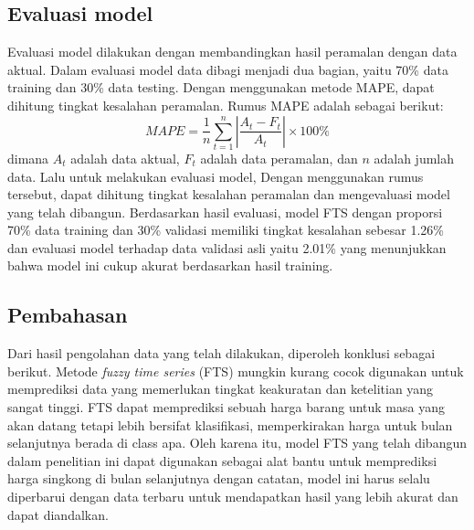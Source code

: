 \documentclass[conference]{IEEEtran}
\begin{document}
\subsection{Evaluasi model}
Evaluasi model dilakukan dengan membandingkan hasil peramalan dengan data aktual. Dalam evaluasi model data dibagi menjadi dua bagian, yaitu 70\% data training dan 30\% data testing. Dengan menggunakan metode MAPE, dapat dihitung tingkat kesalahan peramalan. Rumus MAPE adalah sebagai berikut:
\begin{equation}
    MAPE = \frac{1}{n} \sum_{t=1}^{n} \left| \frac{A_t - F_t}{A_t} \right| \times 100\%
\end{equation}
dimana $A_t$ adalah data aktual, $F_t$ adalah data peramalan, dan $n$ adalah jumlah data. Lalu untuk melakukan evaluasi model,  
Dengan menggunakan rumus tersebut, dapat dihitung tingkat kesalahan peramalan dan mengevaluasi model yang telah dibangun. Berdasarkan hasil evaluasi, model FTS dengan proporsi 70\% data training dan 30\% validasi memiliki tingkat kesalahan sebesar 1.26\% dan evaluasi model terhadap data validasi asli yaitu 2.01\% yang menunjukkan bahwa model ini cukup akurat berdasarkan hasil training.

\subsection{Pembahasan}
Dari hasil pengolahan data yang telah dilakukan, diperoleh konklusi sebagai berikut. Metode \textit{fuzzy time series} (FTS) mungkin kurang cocok digunakan untuk memprediksi data yang memerlukan tingkat keakuratan dan ketelitian yang sangat tinggi. FTS dapat memprediksi sebuah harga barang untuk masa yang akan datang tetapi lebih bersifat klasifikasi, memperkirakan harga untuk bulan selanjutnya berada di class apa. Oleh karena itu, model FTS yang telah dibangun dalam penelitian ini dapat digunakan sebagai alat bantu untuk memprediksi harga singkong di bulan selanjutnya dengan catatan, model ini harus selalu diperbarui dengan data terbaru untuk mendapatkan hasil yang lebih akurat dan dapat diandalkan.
\end{document}
